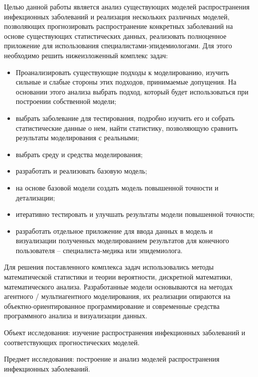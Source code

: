 Целью данной работы является анализ существующих моделей распространения инфекционных заболеваний и  реализация нескольких различных  моделей, позволяющих прогнозировать распространение конкретных заболеваний на основе существующих статистических данных, реализовать полноценное приложение для использования \newline специалистами-эпидемиологами.  Для этого необходимо решить нижеизложенный комплекс задач:
\begin{itemize}
	\item Проанализировать существующие подходы к моделированию, изучить сильные и слабые стороны этих подходов, принимаемые допущения. На основании этого анализа выбрать подход, который будет использоваться при построении собственной модели;
	
	\item выбрать заболевание для тестирования, подробно изучить его и собрать статистические данные о нем, найти статистику, позволяющую сравнить результаты моделирования с реальными;
	
	\item выбрать среду и средства	 моделирования;
	
	\item разработать и реализовать базовую модель;
	
	\item на основе базовой модели создать модель повышенной точности и детализации;
	
	\item итеративно тестировать и улучшать результаты модели повышенной точности; 
	
	\item разработать отдельное приложение для ввода данных в модель и визуализации полученных моделированием результатов для конечного пользователя -- специалиста-медика или эпидемиолога. 	
\end{itemize}

Для решения поставленного комплекса задач использовались методы математической статистики и теории вероятности, дискретной математики, математического анализа. Разработанные модели основываются на методах агентного / мультиагентного моделирования, их реализации опираются на объектно-ориентированное программирование и современные средства  программного анализа и визуализации данных. 

Объект исследования: изучение распространения инфекционных заболеваний и соответствующих прогностических моделей.

Предмет исследования: построение и анализ моделей распространения инфекционных заболеваний.


